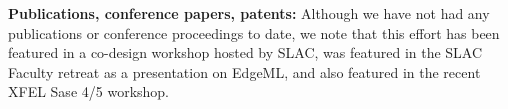 \documentclass[aps]{revtex4}
\begin{document}




%

\textbf{Publications, conference papers, patents: }\noindent
Although we have not had any publications or conference proceedings to date, we note that this effort has been featured in a co-design workshop hosted by SLAC, was featured in the SLAC Faculty retreat as a presentation on EdgeML, and also featured in the recent XFEL Sase 4/5 workshop.
\end{document}
